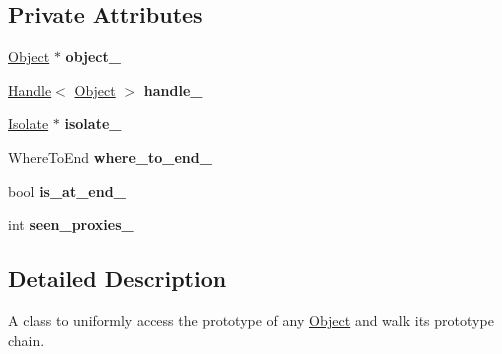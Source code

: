 \subsection*{Private Attributes}
\begin{DoxyCompactItemize}
\item 
\hyperlink{classv8_1_1internal_1_1_object}{Object} $\ast$ {\bfseries object\+\_\+}\hypertarget{classv8_1_1internal_1_1_prototype_iterator_a8137755d92cc794a5b0d41bd1345c2ec}{}\label{classv8_1_1internal_1_1_prototype_iterator_a8137755d92cc794a5b0d41bd1345c2ec}

\item 
\hyperlink{classv8_1_1internal_1_1_handle}{Handle}$<$ \hyperlink{classv8_1_1internal_1_1_object}{Object} $>$ {\bfseries handle\+\_\+}\hypertarget{classv8_1_1internal_1_1_prototype_iterator_af833f7380446d575559ad81d167f041a}{}\label{classv8_1_1internal_1_1_prototype_iterator_af833f7380446d575559ad81d167f041a}

\item 
\hyperlink{classv8_1_1internal_1_1_isolate}{Isolate} $\ast$ {\bfseries isolate\+\_\+}\hypertarget{classv8_1_1internal_1_1_prototype_iterator_a1f3d88fa2b42c1858709921c0d3fede0}{}\label{classv8_1_1internal_1_1_prototype_iterator_a1f3d88fa2b42c1858709921c0d3fede0}

\item 
Where\+To\+End {\bfseries where\+\_\+to\+\_\+end\+\_\+}\hypertarget{classv8_1_1internal_1_1_prototype_iterator_a344df4de06050b319c6cd252950637a5}{}\label{classv8_1_1internal_1_1_prototype_iterator_a344df4de06050b319c6cd252950637a5}

\item 
bool {\bfseries is\+\_\+at\+\_\+end\+\_\+}\hypertarget{classv8_1_1internal_1_1_prototype_iterator_a128eff45dac8aa0d7b8cb2c3739ae98a}{}\label{classv8_1_1internal_1_1_prototype_iterator_a128eff45dac8aa0d7b8cb2c3739ae98a}

\item 
int {\bfseries seen\+\_\+proxies\+\_\+}\hypertarget{classv8_1_1internal_1_1_prototype_iterator_a338eb89b3b7a6f82a071a894ffd1de18}{}\label{classv8_1_1internal_1_1_prototype_iterator_a338eb89b3b7a6f82a071a894ffd1de18}

\end{DoxyCompactItemize}


\subsection{Detailed Description}
A class to uniformly access the prototype of any \hyperlink{classv8_1_1internal_1_1_object}{Object} and walk its prototype chain.

